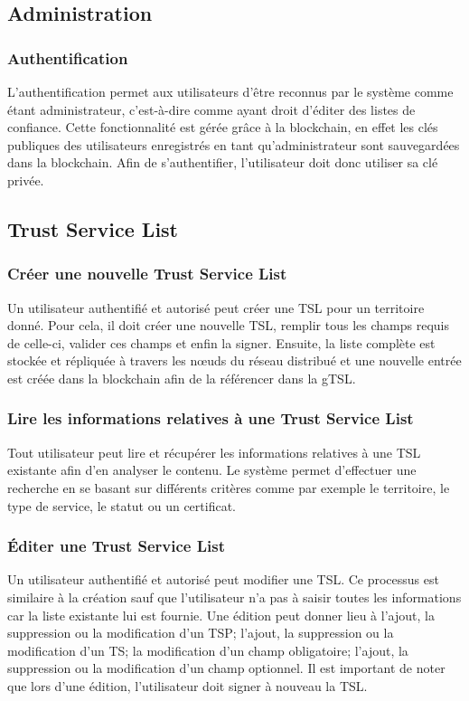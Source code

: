 \documentclass{tnreport}
\begin{document}
\subsection{Administration}
\subsubsection{Authentification}
L'authentification permet aux utilisateurs d'être reconnus par le système comme étant administrateur, c'est-à-dire comme ayant droit d'éditer des listes de confiance. Cette fonctionnalité est gérée grâce à la blockchain, en effet les clés publiques des utilisateurs enregistrés en tant qu'administrateur sont sauvegardées dans la blockchain. Afin de s'authentifier, l'utilisateur doit donc utiliser sa clé privée.

\subsection{Trust Service List}
\label{sec:tsl}
\subsubsection{Créer une nouvelle Trust Service List}
Un utilisateur authentifié et autorisé peut créer une TSL pour un territoire donné. Pour cela, il doit créer une nouvelle TSL, remplir tous les champs requis de celle-ci, valider ces champs et enfin la signer. Ensuite, la liste complète est stockée et répliquée à travers les nœuds du réseau distribué et une nouvelle entrée est créée dans la blockchain afin de la référencer dans la gTSL.
\subsubsection{Lire les informations relatives à une Trust Service List}
Tout utilisateur peut lire et récupérer les informations relatives à une TSL existante afin d'en analyser le contenu. Le système permet d'effectuer une recherche en se basant sur différents critères comme par exemple le territoire, le type de service, le statut ou un certificat.
\subsubsection{Éditer une Trust Service List}
Un utilisateur authentifié et autorisé peut modifier une TSL. Ce processus est similaire à la création sauf que l'utilisateur n'a pas à saisir toutes les informations car la liste existante lui est fournie. Une édition peut donner lieu à l'ajout, la suppression ou la modification d'un TSP; l'ajout, la suppression ou la modification d'un TS; la modification d'un champ obligatoire; l'ajout, la suppression ou la modification d'un champ optionnel. Il est important de noter que lors d'une édition, l'utilisateur doit signer à nouveau la TSL.
\end{document}
